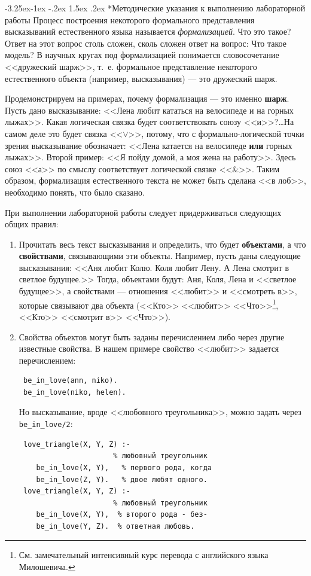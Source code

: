 \documentclass[12pt, openany, twoside]{book} %
\makeatletter
\renewcommand\subsubsection{\@startsection{subsubsection}{3}{\z@}%
                                     {-3.25ex\@plus -1ex \@minus -.2ex}%
                                     {1.5ex \@plus .2ex}%
                                     {\normalfont\normalsize\bfseries}}
\makeatother
\begin{document}
\subsubsection*{Методические указания к выполнению лабораторной работы}
\indent{}Процесс построения некоторого формального представления высказываний естественного языка называется {\em формализацией}. Что это такое? Ответ на этот вопрос столь сложен, сколь сложен ответ на вопрос: Что такое модель? В научных кругах под формализацией понимается словосочетание <<дружеский шарж>>, т.~е. формальное представление некоторого естественного объекта (например, высказывания) --- это дружеский шарж.

Продемонстрируем на примерах, почему формализация --- это именно {\bf шарж}. Пусть дано высказывание: <<Лена любит кататься на велосипеде и на горных лыжах>>. Какая логическая связка будет соответствовать союзу <<и>>?\ldots На самом деле это будет связка <<$\vee$>>, потому, что с формально-логической точки зрения высказывание обозначает: <<Лена катается на велосипеде {\bf или} горных лыжах>>. Второй пример: <<Я пойду домой, а моя жена на работу>>. Здесь союз <<а>> по смыслу соответствует логической связке <<\&>>. Таким образом, формализация естественного текста не может быть сделана <<в лоб>>, необходимо понять, что было сказано.

При выполнении лабораторной работы следует придерживаться следующих общих правил:
\begin{enumerate}
\item Прочитать весь текст высказывания и определить, что будет {\bf объектами}, а что {\bf свойствами}, связывающими эти объекты. Например, пусть даны следующие высказывания: <<Аня любит Колю. Коля любит Лену. А Лена смотрит в светлое будущее.>> Тогда, объектами будут: Аня, Коля, Лена и <<светлое будущее>>, а свойствами --- отношения <<любит>> и <<смотреть в>>, которые связывают два объекта (<<Кто>> <<любит>>
<<Что>>\footnote{См. замечательный интенсивный курс перевода с английского языка Милошевича.}, <<Кто>> <<смотрит в>> <<Что>>).
\item Свойства объектов могут быть заданы перечислением либо через другие известные свойства. В нашем примере свойство <<любит>> задается перечислением:
{\tt\begin{verbatim}
 be_in_love(ann, niko).
 be_in_love(niko, helen).
\end{verbatim}}
\noindent Но высказывание, вроде <<любовного треугольника>>, можно задать через {\tt be\_in\_love/2}:
{\tt\begin{verbatim}
 love_triangle(X, Y, Z) :-
                      % любовный треугольник
    be_in_love(X, Y),   % первого рода, когда
    be_in_love(Z, Y).   % двое любят одного.
 love_triangle(X, Y, Z) :-
                      % любовный треугольник
    be_in_love(X, Y),  % второго рода - без-
    be_in_love(Y, Z).  % ответная любовь.
\end{verbatim}}
\end{enumerate}
\end{document}
